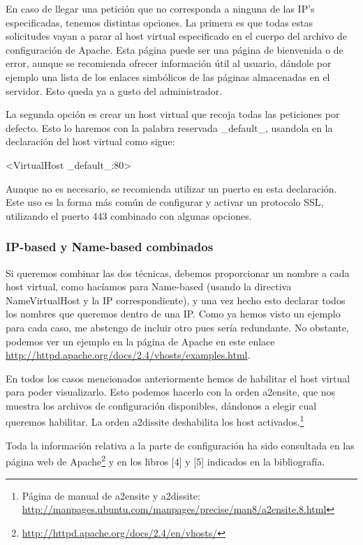 \documentclass[a4paper, 10pt]{article} %
\begin{document}

En caso de llegar una petición que no corresponda a ninguna de las IP's especificadas, tenemos distintas opciones. La primera es que todas estas solicitudes vayan a parar al host virtual especificado en el cuerpo del archivo de configuración de Apache. Esta página puede ser una página de bienvenida o de error, aunque se recomienda ofrecer información útil al usuario, dándole por ejemplo una lista de los enlaces simbólicos de las páginas almacenadas en el servidor. Esto queda ya a gusto del administrador. 

La segunda opción es crear un host virtual que recoja todas las peticiones por defecto. Esto lo haremos con la palabra reservada \_default\_, usandola en la declaración del host virtual como sigue: 

<VirtualHost \_default\_:80> 

Aunque no es necesario, se recomienda utilizar un puerto en esta declaración. Este uso es la forma más común de configurar y activar un protocolo SSL, utilizando el puerto 443 combinado con algunas opciones.  

\subsubsection{IP-based y Name-based combinados}

Si queremos combinar las dos técnicas, debemos proporcionar un nombre a cada host virtual, como hacíamos para Name-based (usando la directiva NameVirtualHost y la IP correspondiente), y una vez hecho esto declarar todos los nombres que queremos dentro de una IP. Como ya hemos visto un ejemplo para cada caso, me abstengo de incluir otro pues sería redundante. No obstante, podemos ver un ejemplo en la página de Apache en este enlace \url{http://httpd.apache.org/docs/2.4/vhosts/examples.html}. 

En todos los casos mencionados anteriormente hemos de habilitar el host virtual para poder visualizarlo. Esto podemos hacerlo con la orden a2ensite, que nos muestra los archivos de configuración disponibles, dándonos a elegir cual queremos habilitar. La orden a2dissite deshabilita los host activados.\footnote{Página de manual de a2ensite y a2dissite: \url{http://manpages.ubuntu.com/manpages/precise/man8/a2ensite.8.html}}

Toda la información relativa a la parte de configuración ha sido consultada en las página web de Apache\footnote{\url{http://httpd.apache.org/docs/2.4/en/vhosts/}} y en los libros [4] y [5] indicados en la bibliografía. 
\end{document}
